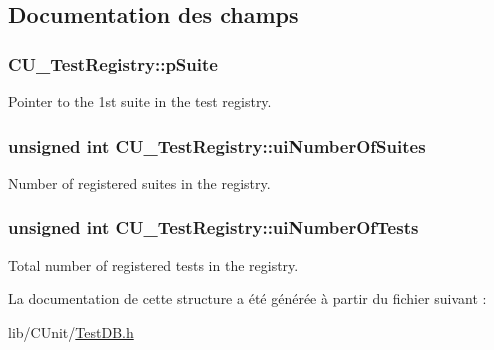 \subsection{Documentation des champs}
\hypertarget{structCU__TestRegistry_ad58e6cd1dd4e6579eb255265593b9da8}{
\subsubsection[{p\-Suite}]{ C\-U\-\_\-\-Test\-Registry\-::p\-Suite}}\label{structCU__TestRegistry_ad58e6cd1dd4e6579eb255265593b9da8}


Pointer to the 1st suite in the test registry. 

\hypertarget{structCU__TestRegistry_aed4b67b99d6e0c875bcf08e924a82d68}{
\subsubsection[{ui\-Number\-Of\-Suites}]{\setlength{\rightskip}{0pt plus 5cm}unsigned int C\-U\-\_\-\-Test\-Registry\-::ui\-Number\-Of\-Suites}}\label{structCU__TestRegistry_aed4b67b99d6e0c875bcf08e924a82d68}


Number of registered suites in the registry. 

\hypertarget{structCU__TestRegistry_a2ecdcc62de28e626fd55d8dc903df06c}{
\subsubsection[{ui\-Number\-Of\-Tests}]{\setlength{\rightskip}{0pt plus 5cm}unsigned int C\-U\-\_\-\-Test\-Registry\-::ui\-Number\-Of\-Tests}}\label{structCU__TestRegistry_a2ecdcc62de28e626fd55d8dc903df06c}


Total number of registered tests in the registry. 



La documentation de cette structure a été générée à partir du fichier suivant \-:\begin{DoxyCompactItemize}
\item 
lib/\-C\-Unit/\hyperlink{TestDB_8h}{Test\-D\-B.\-h}\end{DoxyCompactItemize}
